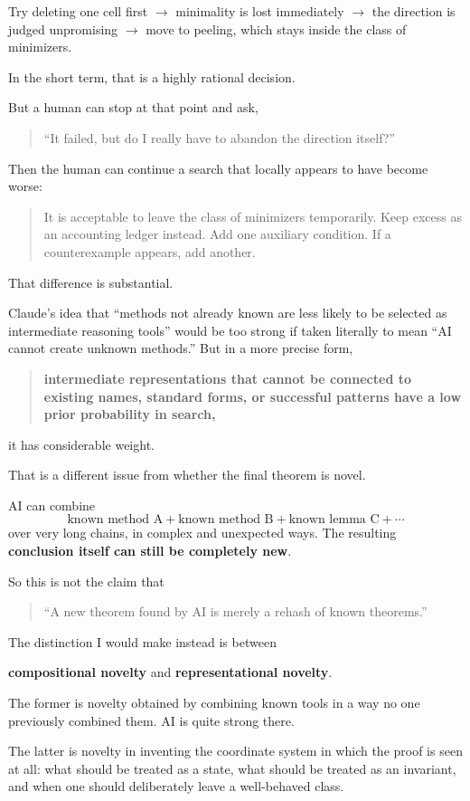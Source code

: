 \documentclass[11pt,a4paper]{article}
\begin{document}
Try deleting one cell first  
$\to$ minimality is lost immediately  
$\to$ the direction is judged unpromising  
$\to$ move to peeling, which stays inside the class of minimizers.

In the short term, that is a highly rational decision.

But a human can stop at that point and ask,
\begin{quote}
“It failed, but do I really have to abandon the direction itself?”
\end{quote}

Then the human can continue a search that locally appears to have become worse:
\begin{quote}
It is acceptable to leave the class of minimizers temporarily.  
Keep excess as an accounting ledger instead.  
Add one auxiliary condition.  
If a counterexample appears, add another.
\end{quote}

That difference is substantial.

Claude's idea that “methods not already known are less likely to be selected as intermediate reasoning tools” would be too strong if taken literally to mean “AI cannot create unknown methods.” But in a more precise form,
\begin{quote}
\textbf{intermediate representations that cannot be connected to existing names, standard forms, or successful patterns have a low prior probability in search,}
\end{quote}
it has considerable weight.

That is a different issue from whether the final theorem is novel.

AI can combine
\[
\text{known method A}
+\text{known method B}
+\text{known lemma C}
+\cdots
\]
over very long chains, in complex and unexpected ways. The resulting \textbf{conclusion itself can still be completely new}.

So this is not the claim that
\begin{quote}
“A new theorem found by AI is merely a rehash of known theorems.”
\end{quote}

The distinction I would make instead is between

\textbf{compositional novelty}
and
\textbf{representational novelty}.

The former is novelty obtained by combining known tools in a way no one previously combined them. AI is quite strong there.

The latter is novelty in inventing the coordinate system in which the proof is seen at all: what should be treated as a state, what should be treated as an invariant, and when one should deliberately leave a well-behaved class.
\end{document}
